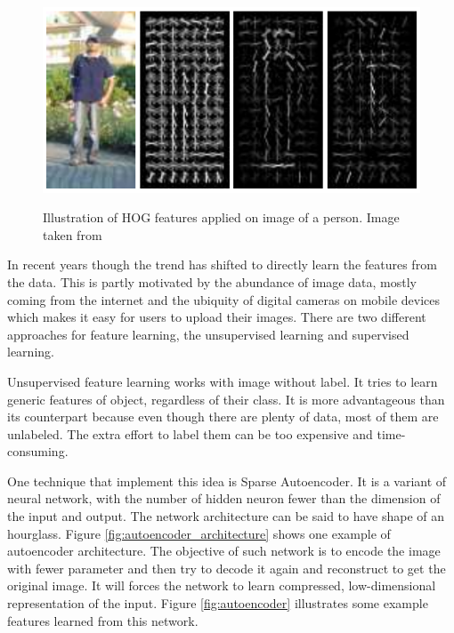 \documentclass[a4paper,11pt]{kth-mag}
\begin{document}
\begin{figure}[h]
\centering
\includegraphics[scale=0.4]{image/hog.png}
\label{fig:hog}
\caption{Illustration of HOG features applied on image of a person. Image taken from \cite{dalal2005hog}}
\end{figure}

In recent years though the trend has shifted to directly learn the features from the data. This is partly motivated by the abundance of image data, mostly coming from the internet and the ubiquity of digital cameras on mobile devices which makes it easy for users to upload their images. There are two different approaches for feature learning, the unsupervised learning and supervised learning.

Unsupervised feature learning works with image without label. It tries to learn generic features of object, regardless of their class. It is more advantageous than its counterpart because even though there are plenty of data, most of them are unlabeled. The extra effort to label them can be too expensive and time-consuming.

One technique that implement this idea is Sparse Autoencoder. It is a variant of neural network, with the number of hidden neuron fewer than the dimension of the input and output. The network architecture can be said to have shape of an hourglass. Figure \ref{fig:autoencoder_architecture} shows one example of autoencoder architecture. The objective of such network is to encode the image with fewer parameter and then try to decode it again and reconstruct to get the original image. It will forces the network to learn compressed, low-dimensional representation of the input. Figure \ref{fig:autoencoder} illustrates some example features learned from this network.
\end{document}
